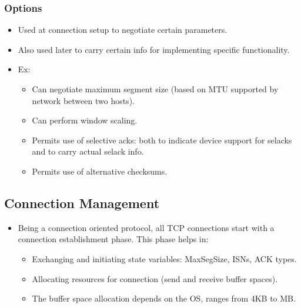 \documentclass{report}
\begin{document}
\subsubsection{Options}
\begin{itemize}
\item Used at connection setup to negotiate certain parameters.
\item Also used later to carry certain info for implementing specific functionality.
\item Ex:
\begin{itemize}
    \item Can negotiate maximum segment size (based on MTU supported by network between two hosts).
    \item Can perform window scaling.
    \item Permits use of selective acks: both to indicate device support for selacks and to carry actual selack info.
    \item Permits use of alternative checksums.
\end{itemize}
\end{itemize}
\subsection{Connection Management}
\begin{itemize}
\item Being a connection oriented protocol, all TCP connections start with a connection establishment phase. This phase helps in:
\begin{itemize}
\item Exchanging and initiating state variables: MaxSegSize, ISNs, ACK types.
\item Allocating resources for connection (send and receive buffer spaces).
\item The buffer space allocation depends on the OS, ranges from 4KB to MB.
\end{itemize}
\end{itemize}
\end{document}
